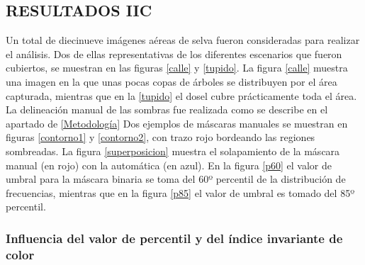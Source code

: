 \subsection{RESULTADOS IIC} \label{Resultados}
Un total de diecinueve imágenes aéreas de selva fueron consideradas para realizar el análisis. Dos de ellas representativas de los diferentes escenarios que fueron cubiertos, se muestran en las figuras \ref{calle} y \ref{tupido}. La figura \ref{calle} muestra una imagen en la que unas pocas copas de árboles se distribuyen por el área capturada, mientras que en la \ref{tupido} el dosel cubre prácticamente toda el área. La delineación manual de las sombras fue realizada como se describe en el apartado de \ref{Metodología}
Dos ejemplos de máscaras manuales se muestran en figuras \ref{contorno1} y \ref{contorno2}, con trazo rojo bordeando las regiones sombreadas. La figura \ref{superposicion} muestra el solapamiento de la máscara manual (en rojo) con la automática (en azul). En la figura \ref{p60} el valor de umbral para la máscara binaria se toma del 60º percentil de la distribución de frecuencias, mientras que en la figura \ref{p85} el valor de umbral es tomado del 85º percentil.



\subsubsection{Influencia del valor de percentil y del índice invariante de color}


